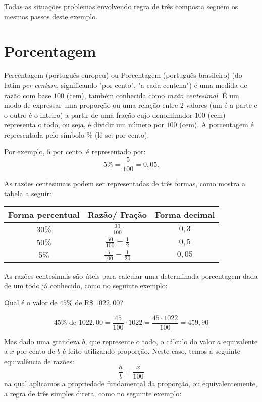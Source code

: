 Todas as situações problemas envolvendo regra de três composta seguem os mesmos passos deste exemplo.


\chapter{Porcentagem}

Percentagem (português europeu) ou Porcentagem (português brasileiro) (do latim \textit{per centum}, significando "por cento", "a cada centena") é uma medida de razão com base $100$ (cem), também conhecida como \textit{razão centesimal}. É um modo de expressar uma proporção ou uma relação entre $2$ valores (um é a parte e o outro é o inteiro) a partir de uma fração cujo denominador $100$ (cem) representa o todo, ou seja, é dividir um número por $100$ (cem). A porcentagem é representada pelo símbolo $\%$ (lê-se: por cento).

Por exemplo, $5$ por cento, é representado por:
\[ 5\%= \frac{5}{100}= 0,05 .\]

As razões centesimais podem ser representadas de três formas, como mostra a tabela a seguir:

\begin{table}[h]
\centering
 \begin{tabular}{|c|c|c|} \hline
  {\textbf{Forma percentual}} & {\textbf{Razão/ Fração}} & \textbf{Forma decimal} \\ \hline
 $30\%$ & $\frac{30}{100}$ & $0,3$ \\\hline
 $50\%$ & $\frac{50}{100} = \frac{1}{2}$ & $0,5$ \\\hline
 $5\%$ & $\frac{5}{100}=\frac{1}{20}$ & $0,05$ \\\hline
 \end{tabular}
\end{table}

As razões centesimais são úteis para calcular uma determinada porcentagem dada de um todo já conhecido, como no seguinte exemplo:
\begin{exem}
 Qual é o valor de $45 \%$ de R\$ $1022,00$?

\[45 \% \text{ de } 1022,00= \frac{45}{100} \cdot 1022= \frac{45\cdot 1022}{100}= 459,90\]
\fim
\end{exem}


Mas dado uma grandeza $b$, que represente o todo, o cálculo do valor $a$ equivalente a $x$ por cento de $b$ é feito utilizando proporção. Neste caso, temos a seguinte equivalência de razões:
\[\frac{a}{b}= \frac{x}{100}\]
na qual aplicamos a propriedade fundamental da proporção, ou equivalentemente, a regra de três simples direta, como no seguinte exemplo:


